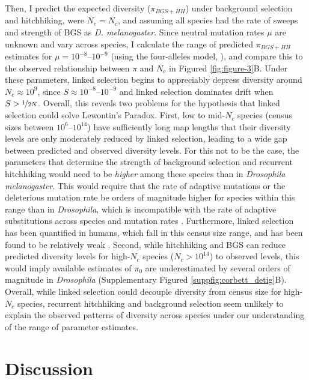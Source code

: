 \documentclass[11pt]{article}
\begin{document}
Then, I predict the expected diversity ($\pi_{BGS+HH}$) under background
selection and hitchhiking, were $N_e= N_c$, and assuming all species had the
rate of sweeps and strength of BGS as \emph{D. melanogaster}. Since neutral
mutation rates $\mu$ are unknown and vary across species, I calculate the range
of predicted $\pi_{BGS+HH}$ estimates for $\mu = 10^{-8}$--$10^{-9}$ (using the
four-alleles model, \cite{Tajima1996-rb}), and compare this to the observed
relationship between $\pi$ and $N_c$ in Figured \ref{fig:figure-3}B.  Under
these parameters, linked selection begins to appreciably depress diversity
around $N_c \approx 10^9$, since $S \approx 10^{-8}$--$10^{-9}$ and linked
selection dominates drift when $S > \nicefrac{1}{2N}$.  Overall, this reveals
two problems for the hypothesis that linked selection could solve Lewontin's
Paradox. First, low to mid-$N_c$ species (census sizes between
$10^{6}$--$10^{14}$) have sufficiently long map lengths that their diversity
levels are only moderately reduced by linked selection, leading to a wide gap
between predicted and observed diversity levels. For this not to be the case,
the parameters that determine the strength of background selection and
recurrent hitchhiking would need to be \emph{higher} among these species than
in \emph{Drosophila melanogaster}. This would require that the rate of adaptive
mutations or the deleterious mutation rate be orders of magnitude higher for
species within this range than in \emph{Drosophila}, which is incompatible with
the rate of adaptive substitutions across species \parencite{Galtier2016-dq}
and mutation rates \parencite{Lynch2010-ki}. Furthermore, linked selection has
been quantified in humans, which fall in this census size range, and has been
found to be relatively weak
\parencite{McVicker2009-ax,Hernandez2011-gs,Hellmann2008-ic,Cai2009-by,Boyko2008-tj}.
Second, while hitchhiking and BGS can reduce predicted diversity levels for
high-$N_c$ species ($N_c > 10^{14}$) to observed levels, this would imply
available estimates of $\pi_0$ are underestimated by several orders of
magnitude in \emph{Drosophila} (Supplementary Figured
\ref{suppfig:corbett_detig}B). Overall, while linked selection could decouple
diversity from census size for high-$N_c$ species, recurrent hitchhiking and
background selection seem unlikely to explain the observed patterns of
diversity across species under our understanding of the range of parameter
estimates.

\section*{Discussion}
\end{document}
